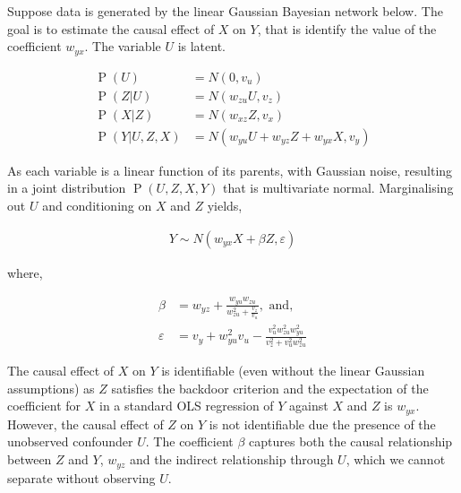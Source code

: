 \documentclass[11pt,a4paper,twoside]{report}
\newcommand{\eqn}[1]{\begin{align}#1\end{align}}
\renewcommand{\P}[1]{\operatorname{P}\left(#1\right)}
\theoremstyle{plain}
\theoremstyle{definition}
\let\epsilon\varepsilon
\begin{document}
Suppose data is generated by the linear Gaussian Bayesian network below. The goal is to estimate the causal effect of $X$ on $Y$, that is identify the value of the coefficient $w_{yx}$. The variable $U$ is latent. 

\eqn{
\P{U} &= N(0 , v_u) \\
\label{eqn:careful_with_priors}
\P{Z|U} &= N(w_{zu}U , v_z) \\
\P{X|Z} &= N(w_{xz}Z , v_x) \\
\P{Y|U,Z,X} & = N(w_{yu}U +w_{yz}Z + w_{yx}X , v_y)
}

\begin{figure}[ht]
\centering
{} 
\caption{ }
\label{fig:careful_with_priors}
\end{figure}

As each variable is a linear function of its parents, with Gaussian noise, resulting in a joint distribution $\P{U,Z,X,Y}$ that is multivariate normal. Marginalising out $U$ and conditioning on $X$ and $Z$ yields,

\eqn{
Y \sim N(w_{yx} X + \beta Z, \epsilon) 
}

where,

\eqn{
\beta &= w_{yz}+\frac{w_{yu}w_{zu}}{w_{zu}^2+\frac{v_z}{v_u}}, \text{ and,}\\
\epsilon &= v_y + w_{yu}^2v_u - \frac{v_u^2 w_{zu}^2 w_{yu}^2 }{v_z^2+v_u^2 w_{zu}^2}
}

The causal effect of $X$ on $Y$ is identifiable (even without the linear Gaussian assumptions) as $Z$ satisfies the backdoor criterion and the expectation of the coefficient for $X$ in a standard OLS regression of $Y$ against $X$ and $Z$ is $w_{yx}$. However, the causal effect of $Z$ on $Y$ is not identifiable due the presence of the unobserved confounder $U$. The coefficient $\beta$ captures both the causal relationship between $Z$ and $Y$, $w_{yz}$ and the indirect relationship through $U$, which we cannot separate without observing $U$. 
\end{document}
